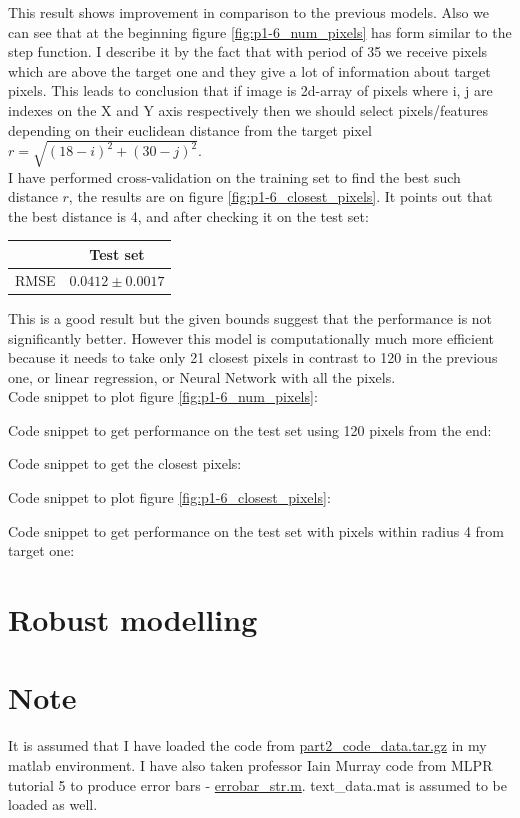 \documentclass{article}
\begin{document}
			This result shows improvement in comparison to the previous models. Also we can see that at the beginning figure \ref{fig:p1-6_num_pixels} has form similar to the step function. I describe it by the fact that with period of 35 we receive pixels which are above the target one and they give a lot of information about target pixels. This leads to conclusion that if image is 2d-array of pixels where i, j are indexes on the X and Y axis respectively then we should select pixels/features depending on their euclidean distance from the target pixel $r = \sqrt{(18 - i)^2 + (30 - j)^2}$. \\
			 I have performed cross-validation on the training set to find the best such distance $r$, the results are on figure \ref{fig:p1-6_closest_pixels}. It points out that the best distance is 4, and after checking it on the test set:
			\begin{center}
				\begin{tabular}{| c | c |}
					\hline
					\, &  Test set \\ \hline
					RMSE & $0.0412 \pm 0.0017$ \\ 
					\hline
				\end{tabular}
			\end{center}
			This is a good result but the given bounds suggest that the performance is not significantly better. However this model is computationally much more efficient because it needs to take only 21 closest pixels in contrast to 120 in the previous one, or linear regression, or Neural Network with all the pixels. \\ 
			Code snippet to plot figure \ref{fig:p1-6_num_pixels}:
			
			Code snippet to get performance on the test set using 120 pixels from the end:
			
			Code snippet to get the closest pixels:
			
			Code snippet to plot figure \ref{fig:p1-6_closest_pixels}:
			
			Code snippet to get performance on the test set with pixels within radius 4 from target one:
			
			\newpage
			
		\section{Robust modelling}
			\section*{Note}
				It is assumed that I have loaded the code from \href{http://www.inf.ed.ac.uk/teaching/courses/mlpr/2015/assignment/part2_code_data.tar.gz}{part2\_code\_data.tar.gz} in my matlab environment. I have also taken professor Iain Murray code from MLPR tutorial 5 to produce error bars - \href{http://homepages.inf.ed.ac.uk/imurray2/code/imurray-matlab/errorbar_str.m}{errobar\_str.m}. text\_data.mat is assumed to be loaded as well.
\end{document}
